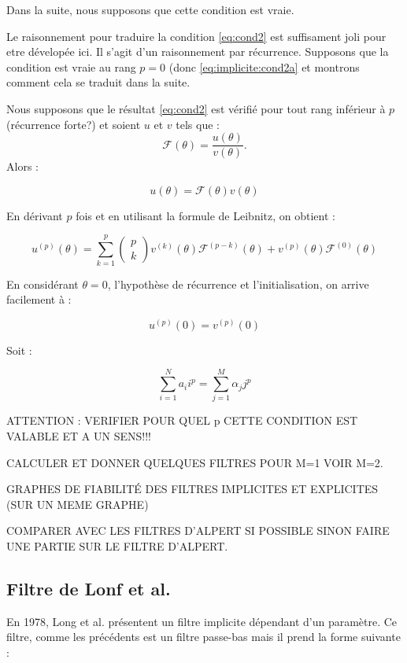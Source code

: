 \documentclass[10pt,a4paper]{amsart}
\begin{document}
Dans la suite, nous supposons que cette condition est vraie.


Le raisonnement pour traduire la condition \eqref{eq:cond2} est suffisament joli pour etre dévelopée ici. Il s'agit d'un raisonnement par récurrence. Supposons que la condition est vraie au rang $p=0$ (donc \eqref{eq:implicite:cond2a} et montrons comment cela se traduit dans la suite.

Nous supposons que le résultat \eqref{eq:cond2} est vérifié pour tout rang inférieur à $p$ (récurrence forte?) et soient $u$ et $v$ tels que :
$$\mathcal{F} ( \theta ) = \dfrac{u(\theta)}{v(\theta)}.$$ Alors :

$$u( \theta ) = \mathcal{F}(\theta) v( \theta )$$

En dérivant $p$ fois et en utilisant la formule de Leibnitz, on obtient :

$$u^{(p)} ( \theta ) = \sum_{k=1}^p \left( \begin{array}{c}p \\ k\end{array}  \right) v^{(k)} ( \theta ) \mathcal{F}^{(p-k)} ( \theta ) + v^{(p)} ( \theta ) \mathcal{F}^{(0)} (\theta) $$

En considérant $\theta = 0$, l'hypothèse de récurrence et l'initialisation, on arrive facilement à :

$$u^{ (p) } (0) =  v^{(p)} (0)$$

Soit :

\begin{equation}
  \label{eq:implicite:cond2b}
  \sum_{i=1}^N a_i i^p = \sum_{j=1}^M \alpha_j j^p
\end{equation}

ATTENTION : VERIFIER POUR QUEL p CETTE CONDITION EST VALABLE ET A UN SENS!!!

CALCULER ET DONNER QUELQUES FILTRES POUR M=1 VOIR M=2.

GRAPHES DE FIABILIT\'E DES FILTRES IMPLICITES ET EXPLICITES (SUR UN MEME GRAPHE)

COMPARER AVEC LES FILTRES D'ALPERT SI POSSIBLE SINON FAIRE UNE PARTIE SUR LE FILTRE D'ALPERT.

\subsection{Filtre de Lonf et al.}

En 1978, Long et al. \cite{Long1978} présentent un filtre implicite dépendant d'un paramètre. Ce filtre, comme les précédents est un filtre passe-bas mais il prend la forme suivante :
\end{document}

